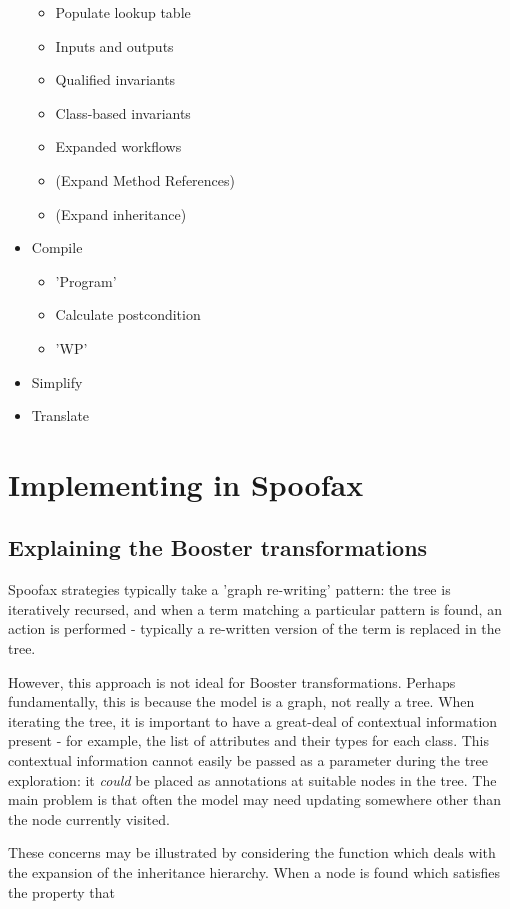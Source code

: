 \begin{itemize}
\begin{itemize}
    \item Populate lookup table
    \item Inputs and outputs
    \item Qualified invariants
    \item Class-based invariants
    \item Expanded workflows
    \item (Expand Method References)
    \item (Expand inheritance)
  \end{itemize}    
  \item Compile
  \begin{itemize}
    \item 'Program'
    \item Calculate postcondition
    \item 'WP'
  \end{itemize}
  \item Simplify
  \item Translate
\end{itemize}
  
\section{Implementing in Spoofax}

\subsection{Explaining the Booster transformations}

Spoofax strategies typically take a 'graph re-writing' pattern: the
tree is iteratively recursed, and when a term matching a particular
pattern is found, an action is performed - typically a re-written
version of the term is replaced in the tree.

However, this approach is not ideal for Booster transformations.
Perhaps fundamentally, this is because the model is a graph, not
really a tree.  When iterating the tree, it is important to have a
great-deal of contextual information present - for example, the list
of attributes and their types for each class.  This contextual
information cannot easily be passed as a parameter during the tree
exploration: it \emph{could} be placed as annotations at suitable nodes in
the tree.  The main problem is that often the model may need updating
somewhere other than the node currently visited.  

These concerns may be illustrated by considering the function which
deals with the expansion of the inheritance hierarchy.  When a node is
found which satisfies the property that

